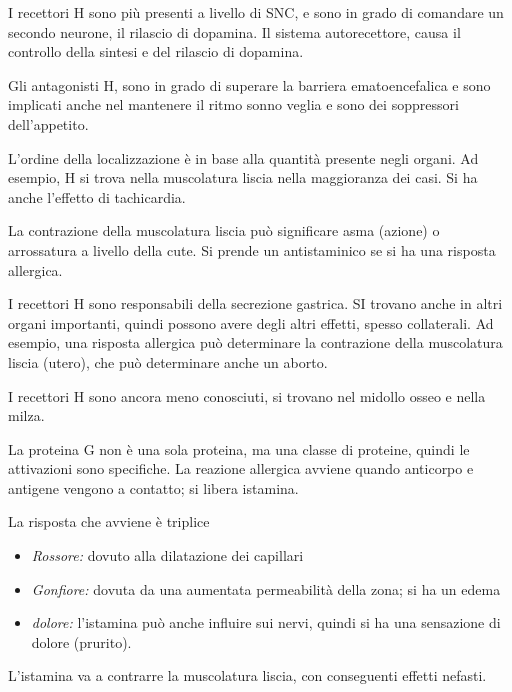 I recettori H sono più presenti a livello di SNC, e sono in grado di
comandare un secondo neurone, il rilascio di dopamina. Il sistema
autorecettore, causa il controllo della sintesi e del rilascio di
dopamina.

Gli antagonisti H, sono in grado di superare la barriera
ematoencefalica e sono implicati anche nel mantenere il ritmo sonno
veglia e sono dei soppressori dell'appetito.

L'ordine della localizzazione è in base alla quantità presente negli
organi. Ad esempio, H si trova nella muscolatura liscia nella
maggioranza dei casi. Si ha anche l'effetto di tachicardia.

La contrazione della muscolatura liscia può significare asma (azione) o
arrossatura a livello della cute.
Si prende un antistaminico se si ha una risposta allergica.

I recettori H sono responsabili della secrezione gastrica. SI trovano
anche in altri organi importanti, quindi possono avere degli altri
effetti, spesso collaterali.
Ad esempio, una risposta allergica può determinare la contrazione della
muscolatura liscia (utero), che può determinare anche un aborto.


I recettori H sono ancora meno conosciuti, si trovano nel midollo osseo
e nella milza.

La proteina G non è una sola proteina, ma una classe di proteine, quindi
le attivazioni sono specifiche.
La reazione allergica avviene quando anticorpo e antigene vengono a
contatto; si libera istamina.

La risposta che avviene è triplice 
\begin{itemize}
  \item \emph{Rossore:} dovuto alla dilatazione
  dei capillari 
  \item \emph{Gonfiore:} dovuta da una aumentata permeabilità della
  zona; si ha un edema 
  \item \emph{dolore:} l'istamina può anche influire sui nervi,
  quindi si ha una sensazione di dolore (prurito).
\end{itemize}
L'istamina va a contrarre la muscolatura liscia, con conseguenti effetti
nefasti.


